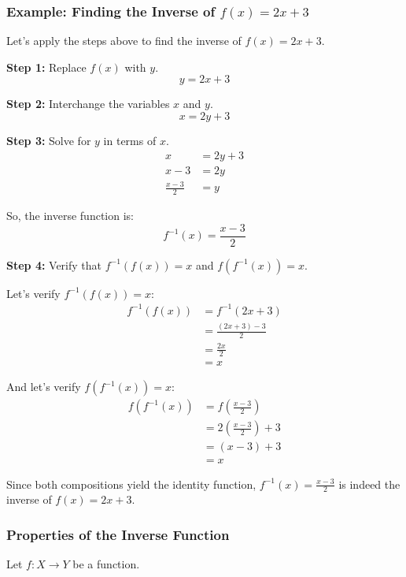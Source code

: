\subsubsection{Example: Finding the Inverse of \texorpdfstring{\(f (x) = 2x + 3\)}{}}
Let's apply the steps above to find the inverse of \(f (x) = 2x + 3\).

\textbf{Step 1:} Replace \(f (x)\) with \(y\).
\[
	y = 2x + 3
\]

\textbf{Step 2:} Interchange the variables \(x\) and \(y\).
\[
	x = 2y + 3
\]

\textbf{Step 3:} Solve for \(y\) in terms of \(x\).
\begin{align*}
	x               & = 2y + 3 \\
	x - 3           & = 2y     \\
	\frac{x - 3}{2} & = y
\end{align*}

So, the inverse function is:
\[
	f^{-1}(x) = \frac{x - 3}{2}
\]

\textbf{Step 4:} Verify that \(f^{-1} (f (x)) = x\) and \(f(f^{-1} (x)) = x\).

Let's verify \(f^{-1} (f (x)) = x\):
\begin{align*}
	f^{-1}(f(x)) & = f^{-1}(2x + 3)         \\
	             & = \frac{(2x + 3) - 3}{2} \\
	             & = \frac{2x}{2}           \\
	             & = x
\end{align*}

And let's verify \(f(f^{-1}(x)) = x\):
\begin{align*}
	f(f^{-1}(x)) & = f\left(\frac{x - 3}{2}\right)     \\
	             & = 2\left(\frac{x - 3}{2}\right) + 3 \\
	             & = (x - 3) + 3                       \\
	             & = x
\end{align*}

Since both compositions yield the identity function, \(f^{-1} (x) = \frac{x - 3}{2}\) is indeed the inverse of \(f (x) = 2x + 3\).


\subsubsection{Properties of the Inverse Function}
Let \(f:X\to Y\) be a function.

